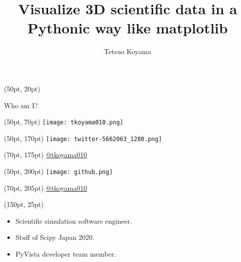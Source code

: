 \documentclass[aspectratio=169,12pt]{beamer}
\title{Visualize 3D scientific data in a Pythonic way like matplotlib}
\begin{document}
\author{Tetsuo Koyama}

\frame{\titlepage}

\begin{frame}[fragile]
\begin{textblock*}{350pt}(50pt, 20pt)
\begin{block}{Who am I?}
\end{block}
\end{textblock*}
\begin{textblock*}{350pt}(50pt, 70pt)
\texttt{[image: tkoyama010.png]}
\end{textblock*}
\begin{textblock*}{350pt}(50pt, 170pt)
\texttt{[image: twitter-5662063\_1280.png]}
\end{textblock*}
\begin{textblock*}{350pt}(70pt, 175pt)
\href{https://twitter.com/tkoyama010}{@tkoyama010}
\end{textblock*}
\begin{textblock*}{350pt}(50pt, 200pt)
\texttt{[image: github.png]}
\end{textblock*}
\begin{textblock*}{350pt}(70pt, 205pt)
\href{https://github.com/tkoyama010}{@tkoyama010}
\end{textblock*}
\begin{textblock*}{350pt}(150pt, 25pt)
\begin{itemize}
\item Scientific simulation software engineer.
\item Stuff of Scipy Japan 2020.
\item PyVista developer team member.
\end{itemize}
\end{textblock*}
\end{frame}
\end{document}
